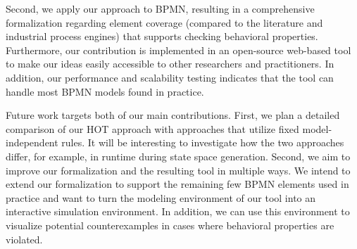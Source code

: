 \documentclass{lmcs} %
\begin{document}
Second, we apply our approach to BPMN, resulting in a comprehensive formalization regarding element coverage (compared to the literature and industrial process engines) that supports checking behavioral properties.
Furthermore, our contribution is implemented in an open-source web-based tool to make our ideas easily accessible to other researchers and practitioners.
In addition, our performance and scalability testing indicates that the tool can handle most BPMN models found in practice.

Future work targets both of our main contributions.
First, we plan a detailed comparison of our HOT approach with approaches that utilize fixed model-independent rules.
It will be interesting to investigate how the two approaches differ, for example, in runtime during state space generation.
Second, we aim to improve our formalization and the resulting tool in multiple ways.
We intend to extend our formalization to support the remaining few BPMN elements used in practice and want to turn the modeling environment of our tool into an interactive simulation environment.
In addition, we can use this environment to visualize potential counterexamples in cases where behavioral properties are violated.


 

\end{document}
